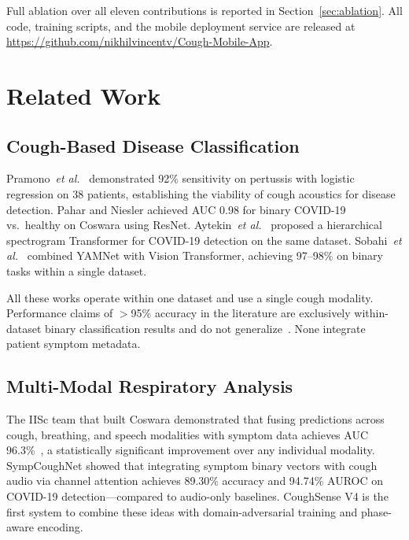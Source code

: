 \documentclass[journal]{IEEEtran}
\begin{document}
Full ablation over all eleven contributions is reported in
Section~\ref{sec:ablation}. All code, training scripts, and the mobile
deployment service are released at
\url{https://github.com/nikhilvincentv/Cough-Mobile-App}.

\section{Related Work}
\label{sec:related}

\subsection{Cough-Based Disease Classification}

Pramono~\textit{et al.}\ \cite{pramono2016} demonstrated
92\% sensitivity on pertussis with logistic regression on 38 patients,
establishing the viability of cough acoustics for disease detection.
Pahar and Niesler \cite{pahar2022} achieved AUC 0.98 for binary
COVID-19 vs.\ healthy on Coswara using ResNet. Aytekin~\textit{et al.}\
\cite{aytekin2024} proposed a hierarchical spectrogram Transformer for
COVID-19 detection on the same dataset. Sobahi~\textit{et al.}\
\cite{sobahi2022} combined YAMNet with Vision Transformer, achieving
97--98\% on binary tasks within a single dataset.

All these works operate within one dataset and use a single cough
modality. Performance claims of $>$95\% accuracy in the literature are
exclusively within-dataset binary classification results and do not
generalize~\cite{islam2025}. None integrate patient symptom metadata.

\subsection{Multi-Modal Respiratory Analysis}

The IISc team that built Coswara demonstrated that fusing predictions
across cough, breathing, and speech modalities with symptom data
achieves AUC 96.3\%~\cite{coswara_multimodal}, a statistically
significant improvement over any individual modality. SympCoughNet
\cite{sympnet2022} showed that integrating symptom binary vectors
with cough audio via channel attention achieves 89.30\% accuracy and
94.74\% AUROC on COVID-19 detection---compared to audio-only baselines.
CoughSense V4 is the first system to combine these ideas with
domain-adversarial training and phase-aware encoding.
\end{document}

